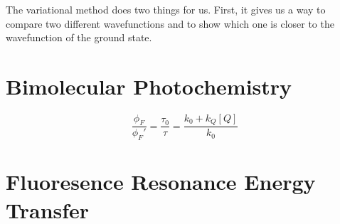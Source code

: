 \documentclass[a4paper]{tufte-handout}
\theoremstyle{definition}
\begin{document}
The variational method does two things for us. First, it gives us a way to compare two 
different wavefunctions and to show which one is closer to the wavefunction of the ground state. 

\section{Bimolecular Photochemistry}

\begin{equation}
  \frac{\phi_{F}}{\phi_{F}'} = \frac{\tau_0}{\tau} = \frac{k_0 + k_Q[Q]}{k_0}
\end{equation}

\section{Fluoresence Resonance Energy Transfer}



\end{document}
